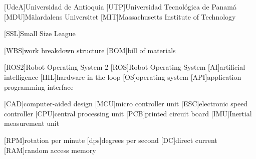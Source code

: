 
[UdeA]{Universidad de Antioquia}
[UTP]{Universidad Tecnológica de Panamá}
[MDU]{Mälardalens Universitet}
[MIT]{Massachusetts Institute of Technology}

[SSL]{Small Size League}

[WBS]{work breakdown structure}
[BOM]{bill of materials}

[ROS2]{Robot Operating System 2}
[ROS]{Robot Operating System}
[AI]{artificial intelligence}
[HIL]{hardware-in-the-loop}
[OS]{operating system}
[API]{application programming interface}

[CAD]{computer-aided design}
[MCU]{micro controller unit}
[ESC]{electronic speed controller}
[CPU]{central processing unit}
[PCB]{printed circuit board}
[IMU]{Inertial measurement unit}

[RPM]{rotation per minute}
[dps]{degrees per second}
[DC]{direct current}
[RAM]{random access memory}

